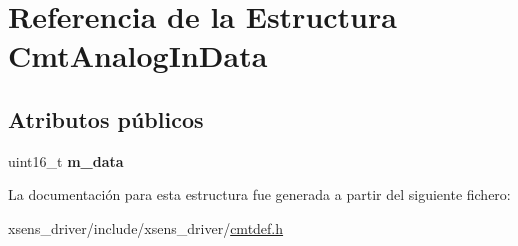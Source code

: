 \hypertarget{structCmtAnalogInData}{\section{\-Referencia de la \-Estructura \-Cmt\-Analog\-In\-Data}
\label{structCmtAnalogInData}
}
\subsection*{\-Atributos públicos}
\begin{DoxyCompactItemize}
\item 
\hypertarget{structCmtAnalogInData_aded923297050525e960418e7ee4ee924}{uint16\-\_\-t {\bfseries m\-\_\-data}}\label{structCmtAnalogInData_aded923297050525e960418e7ee4ee924}

\end{DoxyCompactItemize}


\-La documentación para esta estructura fue generada a partir del siguiente fichero\-:\begin{DoxyCompactItemize}
\item 
xsens\-\_\-driver/include/xsens\-\_\-driver/\hyperlink{cmtdef_8h}{cmtdef.\-h}\end{DoxyCompactItemize}
